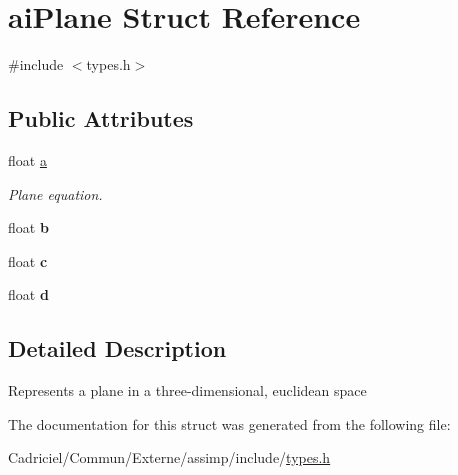 \hypertarget{structai_plane}{}\section{ai\+Plane Struct Reference}
\label{structai_plane}


{\ttfamily \#include $<$types.\+h$>$}

\subsection*{Public Attributes}
\begin{DoxyCompactItemize}
\item 
float \hyperlink{structai_plane_aeadf64e70e6daf1f7f431c90cfc8bce1}{a}\hypertarget{structai_plane_aeadf64e70e6daf1f7f431c90cfc8bce1}{}\label{structai_plane_aeadf64e70e6daf1f7f431c90cfc8bce1}

\begin{DoxyCompactList}\small\item\em Plane equation. \end{DoxyCompactList}\item 
float {\bfseries b}\hypertarget{structai_plane_a84ab33cd9b2f5325282b489f8a2bf11c}{}\label{structai_plane_a84ab33cd9b2f5325282b489f8a2bf11c}

\item 
float {\bfseries c}\hypertarget{structai_plane_a7b0ea36c355ca003a5789088fb24da1f}{}\label{structai_plane_a7b0ea36c355ca003a5789088fb24da1f}

\item 
float {\bfseries d}\hypertarget{structai_plane_ab8696b583b6fab46ae30cd5b691e7c9a}{}\label{structai_plane_ab8696b583b6fab46ae30cd5b691e7c9a}

\end{DoxyCompactItemize}


\subsection{Detailed Description}
Represents a plane in a three-\/dimensional, euclidean space 

The documentation for this struct was generated from the following file\+:\begin{DoxyCompactItemize}
\item 
Cadriciel/\+Commun/\+Externe/assimp/include/\hyperlink{types_8h}{types.\+h}\end{DoxyCompactItemize}
